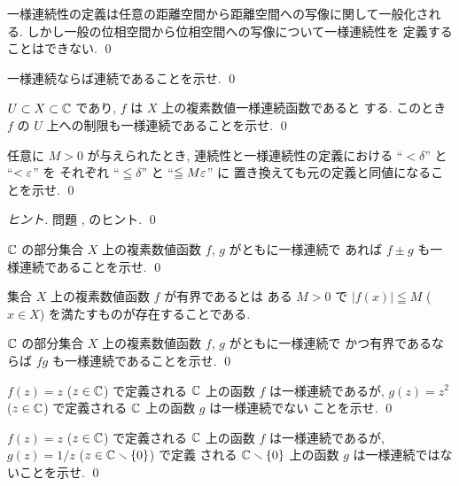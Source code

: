 \documentclass[12pt,twoside]{jarticle}
\begin{document}
\begin{rem}[距離空間論について知っている人へ]
 一様連続性の定義は任意の距離空間から距離空間への写像に関して一般化される.
 しかし一般の位相空間から位相空間への写像について一様連続性を
 定義することはできない.
 \qed
\end{rem}

\begin{question}[易しい]
 一様連続ならば連続であることを示せ. \qed
\end{question}

\begin{question}[易しい]
 $U\subset X\subset {\mathbb C}$ であり, $f$ は $X$ 上の複素数値一様連続函数であると
 する. このとき $f$ の $U$ 上への制限も一様連続であることを示せ.
 \qed
\end{question}

\begin{question}[易しい]
 \label{q:less->leqq(3)}
 任意に $M>0$ が与えられたとき, 
 連続性と一様連続性の定義における
 ``$<\delta$'' と ``$<\varepsilon$'' を
 それぞれ ``$\leqq\delta$'' と ``$\leqq M\varepsilon$'' に
 置き換えても元の定義と同値になることを示せ.
 \qed
\end{question}

\begin{proof}[ヒント]
 問題 ,  のヒント.
 \qed
\end{proof}

\begin{question}
 ${\mathbb C}$ の部分集合 $X$ 上の複素数値函数 $f$, $g$ がともに一様連続で
 あれば $f\pm g$ も一様連続であることを示せ. 
 \qed
\end{question}

集合 $X$ 上の複素数値函数 $f$ が有界であるとは
ある $M>0$ で $|f(x)|\leqq M$ ($x\in X$) を満たすものが存在することである.

\begin{question}
 ${\mathbb C}$ の部分集合 $X$ 上の複素数値函数 $f$, $g$ がともに一様連続で
 かつ有界であるならば $fg$ も一様連続であることを示せ. 
 \qed
\end{question}

\begin{question}
 $f(z)=z$ ($z\in {\mathbb C}$) で定義される ${\mathbb C}$ 上の函数 $f$ は一様連続であるが, 
 $g(z)=z^2$ ($z\in {\mathbb C}$) で定義される ${\mathbb C}$ 上の函数 $g$ は一様連続でない
 ことを示せ.
 \qed
\end{question}

\begin{question}
 $f(z)=z$ ($z\in{\mathbb C}$) で定義される ${\mathbb C}$ 上の函数 $f$ は一様連続であるが, 
 $g(z)=1/z$ ($z\in{\mathbb C}\smallsetminus\{0\}$) で定義
 される ${\mathbb C}\smallsetminus\{0\}$ 上の函数 $g$ は一様連続ではないことを示せ. 
 \qed
\end{question}
\end{document}

